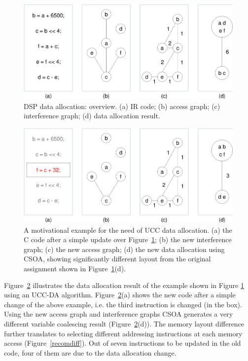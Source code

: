 \begin{figure}[ht]
\begin{center}
\includegraphics[scale=0.5]{figures/csoa.eps}
\caption{DSP data allocation: overview. (a) IR code; (b) access graph; (c) interference graph; (d) data allocation result.}
\label{csoa}
\end{center}
\vspace{-5mm}
\end{figure}


\begin{figure}[ht]
\begin{center}
\includegraphics[scale=0.5]{figures/updcsoa.eps}
\caption{A motivational example for the need of UCC data allocation.
(a) the C code after a simple update over Figure~\ref{csoa};
(b) the new interference graph;
(c) the new access graph;
(d) the new data allocation using CSOA, showing significantly different layout from the original assignment shown in Figure~\ref{csoa}(d).}
\label{updcsoa}
\end{center}
\vspace{-10mm}
\end{figure}

Figure~\ref{updcsoa} illustrates the data allocation result of the example shown in Figure \ref{csoa} using an UCC-DA algorithm.
Figure~\ref{updcsoa}(a) shows the new code after a simple change of the above example, i.e. the third instruction is changed (in the box). Using the new access graph and interference graphs CSOA generates a very different variable coalescing result (Figure~\ref{updcsoa}(d)). The memory layout difference further translates to selecting different addressing instructions at each memory access (Figure~\ref{recomdiff}). Out of seven instructions to be updated in the old code, four of them are due to the data allocation change.


